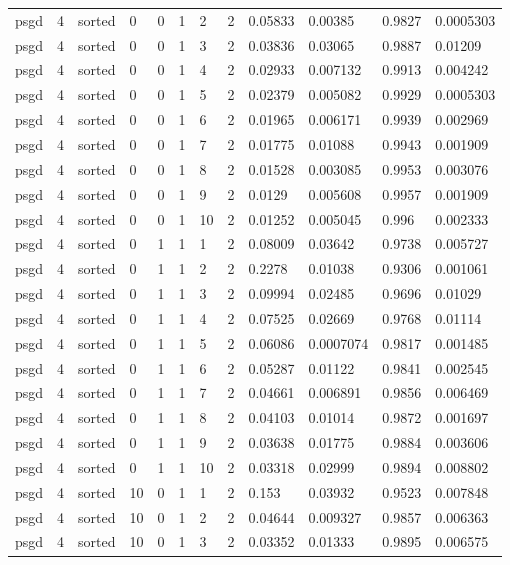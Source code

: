 \begin{tabular}{llllllllllll}
psgd & 4 & sorted & 0 & 0 & 1 & 2 & 2 & 0.05833 & 0.00385 & 0.9827 & 0.0005303 \\
psgd & 4 & sorted & 0 & 0 & 1 & 3 & 2 & 0.03836 & 0.03065 & 0.9887 & 0.01209 \\
psgd & 4 & sorted & 0 & 0 & 1 & 4 & 2 & 0.02933 & 0.007132 & 0.9913 & 0.004242 \\
psgd & 4 & sorted & 0 & 0 & 1 & 5 & 2 & 0.02379 & 0.005082 & 0.9929 & 0.0005303 \\
psgd & 4 & sorted & 0 & 0 & 1 & 6 & 2 & 0.01965 & 0.006171 & 0.9939 & 0.002969 \\
psgd & 4 & sorted & 0 & 0 & 1 & 7 & 2 & 0.01775 & 0.01088 & 0.9943 & 0.001909 \\
psgd & 4 & sorted & 0 & 0 & 1 & 8 & 2 & 0.01528 & 0.003085 & 0.9953 & 0.003076 \\
psgd & 4 & sorted & 0 & 0 & 1 & 9 & 2 & 0.0129 & 0.005608 & 0.9957 & 0.001909 \\
psgd & 4 & sorted & 0 & 0 & 1 & 10 & 2 & 0.01252 & 0.005045 & 0.996 & 0.002333 \\
psgd & 4 & sorted & 0 & 1 & 1 & 1 & 2 & 0.08009 & 0.03642 & 0.9738 & 0.005727 \\
psgd & 4 & sorted & 0 & 1 & 1 & 2 & 2 & 0.2278 & 0.01038 & 0.9306 & 0.001061 \\
psgd & 4 & sorted & 0 & 1 & 1 & 3 & 2 & 0.09994 & 0.02485 & 0.9696 & 0.01029 \\
psgd & 4 & sorted & 0 & 1 & 1 & 4 & 2 & 0.07525 & 0.02669 & 0.9768 & 0.01114 \\
psgd & 4 & sorted & 0 & 1 & 1 & 5 & 2 & 0.06086 & 0.0007074 & 0.9817 & 0.001485 \\
psgd & 4 & sorted & 0 & 1 & 1 & 6 & 2 & 0.05287 & 0.01122 & 0.9841 & 0.002545 \\
psgd & 4 & sorted & 0 & 1 & 1 & 7 & 2 & 0.04661 & 0.006891 & 0.9856 & 0.006469 \\
psgd & 4 & sorted & 0 & 1 & 1 & 8 & 2 & 0.04103 & 0.01014 & 0.9872 & 0.001697 \\
psgd & 4 & sorted & 0 & 1 & 1 & 9 & 2 & 0.03638 & 0.01775 & 0.9884 & 0.003606 \\
psgd & 4 & sorted & 0 & 1 & 1 & 10 & 2 & 0.03318 & 0.02999 & 0.9894 & 0.008802 \\
psgd & 4 & sorted & 10 & 0 & 1 & 1 & 2 & 0.153 & 0.03932 & 0.9523 & 0.007848 \\
psgd & 4 & sorted & 10 & 0 & 1 & 2 & 2 & 0.04644 & 0.009327 & 0.9857 & 0.006363 \\
psgd & 4 & sorted & 10 & 0 & 1 & 3 & 2 & 0.03352 & 0.01333 & 0.9895 & 0.006575 \\

\end{tabular}
